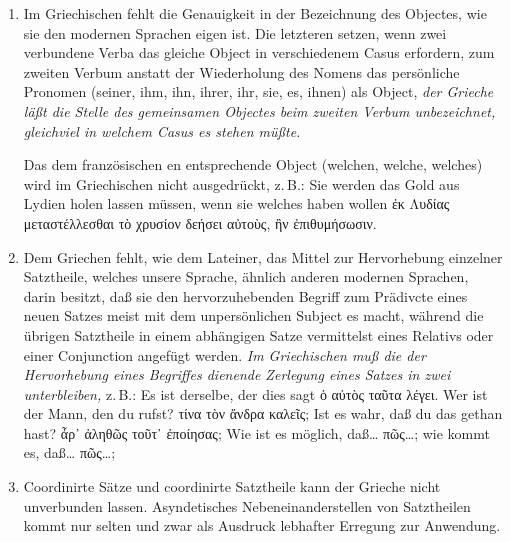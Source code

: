 \begin{enumerate}[leftmargin=0pt,rightmargin=0pt,listparindent =1cm,labelindent=1cm,labelsep=1ex,labelwidth={*},itemindent={*},align=left]
\begin{enumerate}
\begin{quote}
gesehen werden \textgreek[variant=ancient]{καταφανῆ εἰναι},\\
es wird dir nicht geglaubt \textgreek[variant=ancient]{ἄπιστος εἶ}
u. dgl. mehr.
\end{quote}
\end{enumerate}
\item Im Griechischen fehlt die Genauigkeit in der Bezeichnung des Objectes,
wie sie den modernen Sprachen eigen ist. Die letzteren setzen, wenn
zwei verbundene Verba das gleiche Object in verschiedenem Casus erfordern,
zum zweiten Verbum anstatt der Wiederholung des Nomens das persönliche
Pronomen (seiner, ihm, ihn, ihrer, ihr, sie, es, ihnen) als Object,
\emph{der Grieche läßt die Stelle des gemeinsamen Objectes beim zweiten
Verbum unbezeichnet, gleichviel in welchem Casus es stehen müßte.}

Das dem französischen \textfrench{en} entsprechende Object (welchen,
welche, welches) wird im Griechischen nicht aus\textcompwordmark{}gedrückt,
z.\,B.: Sie werden das Gold aus Lydien holen lassen müssen, wenn
sie welches haben wollen \textgreek[variant=ancient]{ἐκ Λυδίας μεταστέλλεσθαι
τὸ χρυσίον δεήσει αὐτοὺς, ἢν ἐπιθυμήσωσιν.}

\item Dem Griechen fehlt, wie dem Lateiner, das Mittel zur Hervorhebung
einzelner Satztheile, welches unsere Sprache, ähnlich anderen modernen
Sprachen, darin besitzt, daß sie den hervorzuhebenden Begriff zum
Prädivcte eines neuen Satzes meist mit dem unpersönlichen Subject
es macht, während die übrigen Satztheile in einem abhängigen Satze
vermittelst eines Relativs oder einer Conjunction angefügt werden.
\emph{Im Griechischen muß die der Hervorhebung eines Begriffes dienende
Zerlegung eines Satzes in zwei unterbleiben,} z.\,B.:  Es ist derselbe,
der dies sagt \textgreek[variant=ancient]{ὁ αὐτὸς ταῦτα λέγει}. Wer
ist der Mann, den du rufst? \textgreek[variant=ancient]{τίνα τὸν ἄνδρα
καλεῖς;} Ist es wahr, daß du das gethan hast? \textgreek[variant=ancient]{ἆρ᾽
ἀληθῶς τοῦτ᾽ ἐποίησας;} Wie ist es möglich, daß\ldots{} \textgreek[variant=ancient]{πῶς\ldots{};}
wie kommt es, daß\ldots{} \textgreek[variant=ancient]{πῶς\ldots{}; }
\item Coordinirte Sätze und coordinirte Satztheile kann der Grieche nicht
unverbunden lassen. Asyndetisches Nebeneinanderstellen von Satztheilen
kommt nur selten und zwar als Aus\textcompwordmark{}druck lebhafter
Erregung zur Anwendung.



\end{enumerate}
